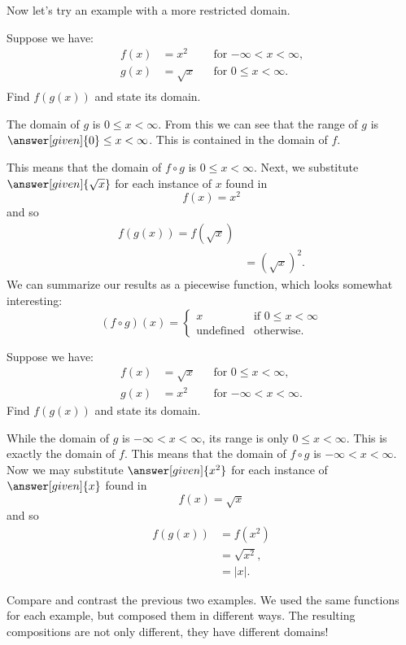 \documentclass{ximera}
\begin{document}
Now let's try an example with a more restricted domain.

\begin{example}
 Suppose we have:
\begin{align*}
  f(x)&=x^2 &&\text{for $-\infty< x< \infty$,}\\
  g(x)&= \sqrt{x} &&\text{for $0\le x< \infty$.}\\
\end{align*}
Find $f(g(x))$ and state its domain.
\begin{explanation}
  The domain of $g$ is $0\le x< \infty$. From this we can see that the
  range of $g$ is $\answer[given]{0}\le x< \infty$. This is contained
  in the domain of $f$.

  This means that the domain of $f\circ g$ is $0\le x< \infty$.  Next,
  we substitute $\answer[given]{\sqrt{x}}$ for each instance of $x$
  found in
  \[
  f(x)={{x}^{2}}
  \]
  and so
  \begin{align*}
  f(g(x))=f(\sqrt{x})\\
  &=\left(\sqrt{x}\right)^2.
  \end{align*}
  We can summarize our results as a piecewise function, which
  looks somewhat interesting:
  \[
  (f\circ g)(x) = 
  \begin{cases}
    x & \text{if $0\le x < \infty$}\\
   \text{undefined} &\text{otherwise}. 
  \end{cases}
  \]
\end{explanation}
\end{example}


\begin{example}
 Suppose we have:
\begin{align*}
  f(x)&=\sqrt{x} &&\text{for $0\le x< \infty$,}\\
  g(x)&= x^2 &&\text{for $-\infty< x< \infty$.}
\end{align*}
Find $f(g(x))$ and state its domain.
\begin{explanation}
  While the domain of $g$ is $-\infty< x< \infty$, its range is only
  $0 \le x<\infty$. This is exactly the domain of $f$. This means that
  the domain of $f\circ g$ is $-\infty< x< \infty$. %
  Now we may substitute $\answer[given]{x^2}$ for each instance of
  $\answer[given]{x}$ found in
  \[
  f(x)=\sqrt{x}
  \]
  and so
  \begin{align*}
  f(g(x))&=f(x^2)\\
  &=\sqrt{x^2},\\
  &=|x|.
  \end{align*}
\end{explanation}
\end{example}

Compare and contrast the previous two examples.  We used the same
functions for each example, but composed them in different ways.  The resulting
compositions are not only different, they have different domains!
\end{document}
